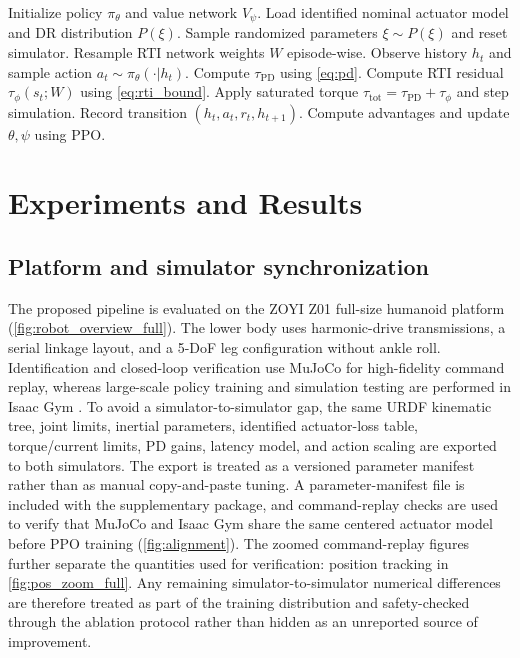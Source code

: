 \documentclass[twoside,final,1p,times]{elsarticle}
\newcommand{\rev}[1]{#1}
\newcommand{\minorrev}[1]{#1}
\begin{document}
\begin{algorithm}[t]
\caption{PPO training with identification-informed DR and episode-randomized RTI}
\label{alg:training}
\begin{algorithmic}[1]
\State Initialize policy $\pi_\theta$ and value network $V_\psi$.
\State Load identified nominal actuator model and DR distribution $P(\xi)$.
    \State Sample randomized parameters $\xi\sim P(\xi)$ and reset simulator.
    \State Resample RTI network weights $W$ episode-wise.
      \State Observe history $h_t$ and sample action $a_t\sim\pi_\theta(\cdot|h_t)$.
      \State Compute $\tau_{\mathrm{PD}}$ using \cref{eq:pd}.
      \State Compute RTI residual $\tau_\phi(s_t;W)$ using \cref{eq:rti_bound}.
      \State Apply saturated torque $\tau_{\mathrm{tot}}=\tau_{\mathrm{PD}}+\tau_\phi$ and step simulation.
      \State Record transition $(h_t,a_t,r_t,h_{t+1})$.
    \EndFor
  \EndFor
  \State Compute advantages and update $\theta,\psi$ using PPO.
\EndFor
\end{algorithmic}
\end{algorithm}

\section{Experiments and Results}
\label{sec:experiments}

\subsection{Platform and simulator synchronization}
The proposed pipeline is evaluated on the ZOYI Z01 full-size humanoid platform (\cref{fig:robot_overview_full}). The lower body uses harmonic-drive transmissions, a serial linkage layout, and a 5-DoF leg configuration without ankle roll. Identification and closed-loop verification use MuJoCo for high-fidelity command replay, whereas large-scale policy training and simulation testing are performed in Isaac Gym \minorrev{\citep{todorov2012mujoco,makoviychuk2021isaacgym}}. \rev{To avoid a simulator-to-simulator gap, the same URDF kinematic tree, joint limits, inertial parameters, identified actuator-loss table, torque/current limits, PD gains, latency model, and action scaling are exported to both simulators. The export is treated as a versioned parameter manifest rather than as manual copy-and-paste tuning. A parameter-manifest file is included with the supplementary package, and command-replay checks are used to verify that MuJoCo and Isaac Gym share the same centered actuator model before PPO training (\cref{fig:alignment}). The zoomed command-replay figures further separate the quantities used for verification: position tracking in \cref{fig:pos_zoom_full}. Any remaining simulator-to-simulator numerical differences are therefore treated as part of the training distribution and safety-checked through the ablation protocol rather than hidden as an unreported source of improvement.}
\end{document}
